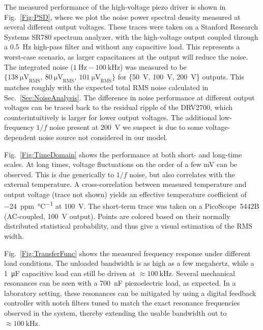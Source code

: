 \documentclass[aip,rsi,reprint]{revtex4-1} %
\begin{document}
The measured performance of the high-voltage piezo driver is shown in Fig.~\ref{Fig:PSD}, where we plot the noise power spectral density measured at several different output voltages.
These traces were taken on a Stanford Research Systems SR780 spectrum analyzer, with the high-voltage output coupled through a \SI{0.5}{\hertz} high-pass filter and without any capacitive load.
This represents a worst-case scenario, as larger capacitances at the output will reduce the noise.
The integrated noise ($\SI{1}{\hertz} - \SI{100}{\kilo\hertz}$) was measured to be $\{\SI{138}{\micro\volt}_\text{RMS},~\SI{80}{\micro\volt}_\text{RMS},~\SI{101}{\micro\volt}_\text{RMS}\}$ for \{\SI{50}{\volt}, \SI{100}{\volt}, \SI{200}{\volt}\} outputs. 
This matches roughly with the expected total RMS noise calculated in Sec.~\ref{Sec:NoiseAnalysis}.
The difference in noise performance at different output voltages can be traced back to the residual ripple of the DRV2700, which counterintuitively is larger for lower output voltages.
The additional low-frequency $1/f$ noise present at \SI{200}{\volt} we suspect is due to some voltage-dependent noise source not considered in our model.

Fig.~\ref{Fig:TimeDomain} shows the performance at both short- and long-time scales.
At long times, voltage fluctuations on the order of a few \si{\milli\volt} can be observed.
This is due generically to $1/f$ noise, but also correlates with the external temperature.
A cross-correlation between measured temperature and output voltage (trace not shown) yields an effective temperature coefficient of \SI[per-mode=symbol]{-24}{ppm\per\celsius} at \SI{100}{\volt}.
The short-term trace was taken on a PicoScope~5442B (AC-coupled, \SI{100}{\volt} output).
Points are colored based on their normally distributed statistical probability, and thus give a visual estimation of the RMS width.


Fig.~\ref{Fig:TransferFunc} shows the measured frequency response under different load conditions. The unloaded bandwidth is as high as a few megahertz, while a \SI{1}{\micro\farad} capacitive load can still be driven at $\approx\SI{100}{\kilo\hertz}$. 
Several mechanical resonances can be seen with a \SI{700}{\nano\farad} piezoelectric load, as expected.
In a laboratory setting, these resonances can be mitigated by using a digital feedback controller with notch filters tuned to match the exact resonance frequencies observed in the system\cite{Ryou2016a}, thereby extending the usable bandwidth out to $\approx\SI{100}{\kilo\hertz}$.
\end{document}
